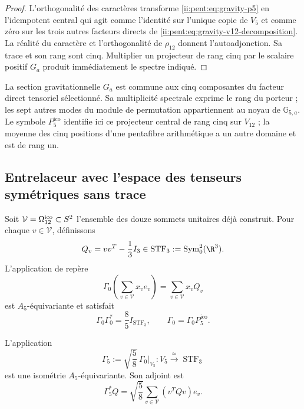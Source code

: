 \begin{proof}
L’orthogonalité des caractères transforme \eqref{ii:pent:eq:gravity-p5} en
l’idempotent central qui agit comme l’identité sur l’unique copie de
\(V_5\) et comme zéro sur les trois autres facteurs directs de
\eqref{ii:pent:eq:gravity-v12-decomposition}. La réalité du caractère et
l’orthogonalité de \(\rho_{12}\) donnent l’autoadjonction. Sa trace et son rang
sont cinq. Multiplier un projecteur de rang cinq par le scalaire positif
\(G_a\) produit immédiatement le spectre indiqué.
\end{proof}

La section gravitationnelle \(G_a\) est commune aux cinq composantes du
facteur direct tensoriel sélectionné. Sa multiplicité spectrale exprime le
rang du porteur ; les sept autres modes du module de permutation
appartiennent au noyau de \(\mathbb G_{5,a}\). Le symbole
\(P^{\mathrm{ico}}_5\) identifie ici ce projecteur central de rang
cinq sur \(V_{12}\) ; la moyenne des cinq positions d’une
pentafibre arithmétique a un autre domaine et est de rang un.

\subsection{Entrelaceur avec l’espace des tenseurs symétriques sans trace}

Soit \(\mathcal V=\Omega_{12}^{\rm ico}\subset S^2\) l’ensemble des
douze sommets unitaires déjà construit. Pour chaque \(v\in\mathcal V\), définissons
\begin{equation}
\label{ii:pent:eq:gravity-Qv}
Q_v=vv^T-\frac13I_3\in
\operatorname{STF}_3:=\operatorname{Sym}^2_0(\R^3).
\end{equation}
L’application de repère
\begin{equation}
\label{ii:pent:eq:gravity-Gamma0}
\Gamma_0\!\left(\sum_{v\in\mathcal V}x_ve_v\right)
=\sum_{v\in\mathcal V}x_vQ_v
\end{equation}
est \(A_5\)-équivariante et satisfait
\begin{equation}
\label{ii:pent:eq:gravity-tight-frame}
\Gamma_0\Gamma_0^*=\frac85I_{\operatorname{STF}_3},
\qquad
\Gamma_0=\Gamma_0P^{\mathrm{ico}}_5.
\end{equation}

\begin{theorem}
\label{ii:pent:thm:gravity-gamma5}
L’application
\begin{equation}
\label{ii:pent:eq:gravity-gamma5}
\boxed{
\Gamma_5:=\sqrt{\frac58}\,\Gamma_0|_{V_5}:
V_5\xrightarrow{\ \simeq\ }\operatorname{STF}_3}
\end{equation}
est une isométrie \(A_5\)-équivariante. Son adjoint est
\begin{equation}
\label{ii:pent:eq:gravity-gamma5-adjoint}
\Gamma_5^*Q=\sqrt{\frac58}
\sum_{v\in\mathcal V}(v^TQv)e_v.
\end{equation}
\end{theorem}

